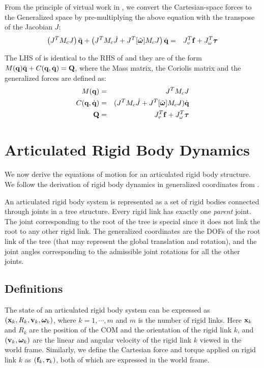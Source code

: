 From the principle of virtual work in , we convert the Cartesian-space forces to the Generalized space by pre-multiplying the above equation with the transpose of the Jacobian $J$:
\begin{eqnarray}
\label{eq:dyngen_vec2}
\left (J^T M_c J \right ) \ddot{\mathbf{q}} + \left (J^T M_c \dot{J} + J^T [\tilde{\bm{\omega}}]M_c J \right ) \dot{\mathbf{q}} & = & J_v^T \mathbf{f} + J_\omega^T \bm{\tau}
\end{eqnarray}

The LHS of  is identical to the RHS of  and they are of the form $M(\mathbf{q})\ddot{\mathbf{q}} + C(\mathbf{q},\dot{\mathbf{q}}) = \mathbf{Q}$, where the Mass matrix, the Coriolis matrix and the generalized forces are defined as:
\begin{eqnarray}
\label{eq:summary_dynamics}
\nonumber
M(\mathbf{q}) & = & J^T M_c J\\
\nonumber
C(\mathbf{q},\dot{\mathbf{q}}) & = & (J^T M_c \dot{J} + J^T [\tilde{\bm{\omega}}]M_c J)\dot{\mathbf{q}}\\
\mathbf{Q} & = & J_v^T \mathbf{f} + J_\omega^T \bm{\tau}
\end{eqnarray}

\newpage
\section{Articulated Rigid Body Dynamics}
We now derive the equations of motion for an articulated rigid body structure. We follow the derivation of rigid body dynamics in generalized coordinates from .

An articulated rigid body system is represented as a set of rigid bodies connected through joints in a tree structure. Every rigid link has exactly one \emph{parent} joint. The joint corresponding to the root of the tree is special since it does not link the root to any other rigid link. The generalized coordinates are the DOFs of the root link of the tree (that may represent the global translation and rotation), and the joint angles corresponding to the admissible joint rotations for all the other joints. 

\subsection{Definitions}
The state of an articulated rigid body
system can be expressed as $(\mathbf{x}_k, R_k, \mathbf{v}_k,
\boldsymbol{\bm{\omega}}_k)$, where $k = 1, \cdots, m$ and $m$ is the number of rigid links. Here $\mathbf{x}_k$ and
$R_k$ are the position of the COM and the orientation of the rigid link $k$, and $(\mathbf{v}_k,
{\bm{\omega}}_k)$ are the linear and angular velocity of the
rigid link $k$ viewed in the world frame. Similarly, we define the
Cartesian force and torque applied on rigid link $k$ as $(\mathbf{f}_k,
{\bm{\tau}}_k)$, both of which are expressed in the world
frame.

